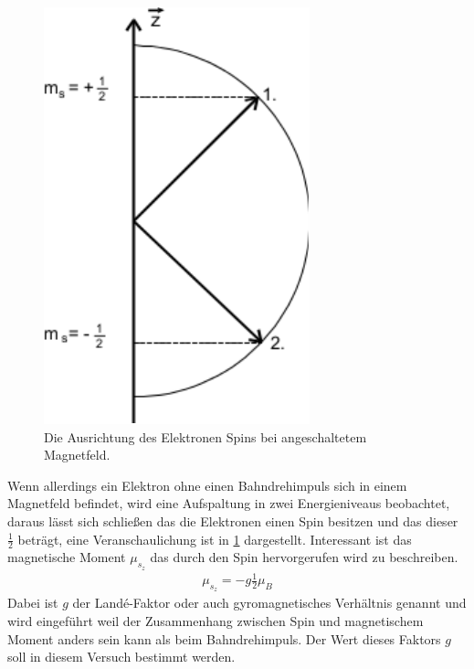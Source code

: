 \begin{figure}
	\centering
	\includegraphics[width=\textwidth/4]{../Grafiken/SpinElektron.pdf}
	\caption{Die Ausrichtung des Elektronen Spins bei angeschaltetem Magnetfeld.\cite{V28}}\label{fig:ResonanzTheo}
\end{figure}
Wenn allerdings ein Elektron ohne einen Bahndrehimpuls sich in einem Magnetfeld befindet, wird eine Aufspaltung in zwei Energieniveaus beobachtet, daraus lässt sich schließen das die Elektronen einen Spin besitzen und das dieser $\frac{1}{2}$ beträgt, eine Veranschaulichung ist in \cref{fig:ResonanzTheo} dargestellt.
Interessant ist das magnetische Moment $\mu_{s_z}$ das durch den Spin hervorgerufen wird zu beschreiben.
\begin{align}
	\mu_{s_z}=-g\frac{1}{2}\mu_B\label{eq:musz}
\end{align}
Dabei ist $g$ der Landé-Faktor oder auch gyromagnetisches  Verhältnis genannt und wird eingeführt weil der Zusammenhang zwischen Spin und magnetischem Moment anders sein kann als beim Bahndrehimpuls. Der Wert dieses Faktors $g$ soll in diesem Versuch bestimmt werden.

